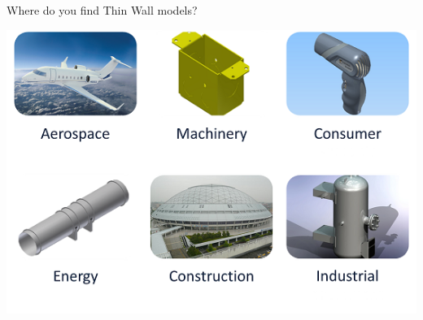 \begin{frame}{Where do you find Thin Wall models?}
\vspace{1cm}

\includegraphics[width=0.85\linewidth]{../Common/images/ThinWallApplications.png}


\end{frame}


